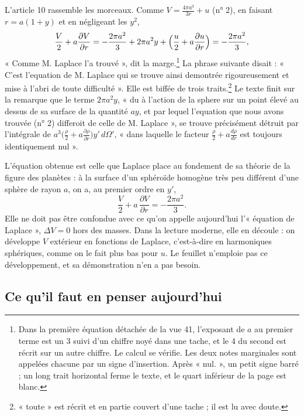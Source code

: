 \documentclass[11pt,a4paper]{article}
\begin{document}
L'article 10 rassemble les morceaux. Comme \(V=\frac{4\pi a^3}{3r}+u\)
(n° 2), en faisant \(r=a(1+y)\) et en négligeant les \(y^2\),
\[
\frac V2+a\frac{\partial V}{\partial r}
=-\frac{2\pi a^2}{3}+2\pi a^2y+\Bigl(\frac u2+a\frac{\partial u}{\partial r}\Bigr)
=-\frac{2\pi a^2}{3},
\]
« Comme M. Laplace l'a trouvé », dit la marge.\footnote{Dans la première
équation détachée de la vue 41, l'exposant de \(a\) au premier terme est un 3
suivi d'un chiffre noyé dans une tache, et le 4 du second est récrit sur un
autre chiffre. Le calcul se vérifie. Les deux notes marginales sont appelées
chacune par un signe d'insertion. Après « nul. », un petit signe barré ; un
long trait horizontal ferme le texte, et le quart inférieur de la page est
blanc.} La phrase suivante disait : « C'est l'equation de M. Laplace qui se
trouve ainsi demontrée rigoureusement et mise à l'abri de toute difficulté ».
Elle est biffée de trois traits.\footnote{« toute » est récrit et en partie
couvert d'une tache ; il est lu avec doute.} Le texte finit sur la remarque
que le terme \(2\pi a^2y\), « du à l'action de la sphere sur un point élevé au
dessus de sa surface de la quantité \(ay\), et par lequel l'equation que nous
avons trouvée (n° 2) differoit de celle de M. Laplace », se trouve
précisément détruit par l'intégrale de \(a^3\bigl(\frac\rho2+a\frac{\partial
\rho}{\partial r}\bigr)y'\,d\Omega'\), « dans laquelle le facteur
\(\frac\rho2+a\frac{d\rho}{dr}\) est toujours identiquement nul ».

L'équation obtenue est celle que Laplace place au fondement de sa théorie de
la figure des planètes : à la surface d'un sphéroïde homogène très peu
différent d'une sphère de rayon \(a\), on a, au premier ordre en \(y'\),
\[
\frac V2+a\,\frac{\partial V}{\partial r}=-\frac{2\pi a^2}{3} .
\]
Elle ne doit pas être confondue avec ce qu'on appelle aujourd'hui l'« équation
de Laplace », \(\Delta V=0\) hors des masses. Dans la lecture moderne, elle en
découle : on développe \(V\) extérieur en fonctions de Laplace, c'est-à-dire en
harmoniques sphériques, comme on le fait plus bas pour \(u\). Le feuillet
n'emploie pas ce développement, et sa démonstration n'en a pas besoin.

\subsection*{Ce qu'il faut en penser aujourd'hui}
\end{document}
